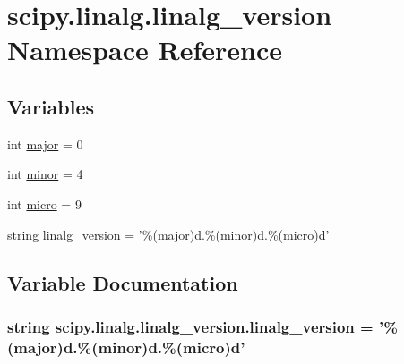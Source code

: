 \hypertarget{namespacescipy_1_1linalg_1_1linalg__version}{}\section{scipy.\+linalg.\+linalg\+\_\+version Namespace Reference}
\label{namespacescipy_1_1linalg_1_1linalg__version}
\subsection*{Variables}
\begin{DoxyCompactItemize}
\item 
int \hyperlink{namespacescipy_1_1linalg_1_1linalg__version_ab456cf5df525f135170ddd8b01a4aa46}{major} = 0
\item 
int \hyperlink{namespacescipy_1_1linalg_1_1linalg__version_ad25930bffba7a2a2e05ee837aed09b15}{minor} = 4
\item 
int \hyperlink{namespacescipy_1_1linalg_1_1linalg__version_a91c9ea1141dba5acaec339aa9745a3fb}{micro} = 9
\item 
string \hyperlink{namespacescipy_1_1linalg_1_1linalg__version_a38cb86b7e6015577a5103787f40322f4}{linalg\+\_\+version} = '\%(\hyperlink{namespacescipy_1_1linalg_1_1linalg__version_ab456cf5df525f135170ddd8b01a4aa46}{major})d.\%(\hyperlink{namespacescipy_1_1linalg_1_1linalg__version_ad25930bffba7a2a2e05ee837aed09b15}{minor})d.\%(\hyperlink{namespacescipy_1_1linalg_1_1linalg__version_a91c9ea1141dba5acaec339aa9745a3fb}{micro})d'
\end{DoxyCompactItemize}


\subsection{Variable Documentation}
\hypertarget{namespacescipy_1_1linalg_1_1linalg__version_a38cb86b7e6015577a5103787f40322f4}{}
\subsubsection[{linalg\+\_\+version}]{\setlength{\rightskip}{0pt plus 5cm}string scipy.\+linalg.\+linalg\+\_\+version.\+linalg\+\_\+version = '\%({\bf major})d.\%({\bf minor})d.\%({\bf micro})d'}\label{namespacescipy_1_1linalg_1_1linalg__version_a38cb86b7e6015577a5103787f40322f4}
\hypertarget{namespacescipy_1_1linalg_1_1linalg__version_ab456cf5df525f135170ddd8b01a4aa46}{}

